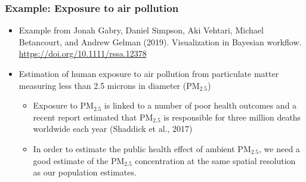 \documentclass[10pt,handout]{beamer}
\begin{document}
\begin{frame}

\frametitle{Example: Exposure to air pollution}

  \begin{itemize}
  \item Example from Jonah Gabry, Daniel Simpson, Aki Vehtari, Michael
    Betancourt, and Andrew Gelman (2019). Visualization in Bayesian
    workflow. \url{https://doi.org/10.1111/rssa.12378}
  \item Estimation of human exposure to air pollution from particulate
    matter measuring less than 2.5 microns in diameter ($\mathrm{PM}_{2.5}$)
    \begin{itemize}
    \item Exposure to $\mathrm{PM}_{2.5}$ is linked to a number of
      poor health outcomes and a recent report estimated that
      $\mathrm{PM}_{2.5}$ is responsible for three million deaths
      worldwide each year (Shaddick et al., 2017)
    \item In order to estimate the public health effect of ambient
      $\mathrm{PM}_{2.5}$, we need a good estimate of the
      $\mathrm{PM}_{2.5}$ concentration at the same spatial resolution
      as our population estimates.
    \end{itemize}
\end{itemize}

\end{frame}
\end{document}
